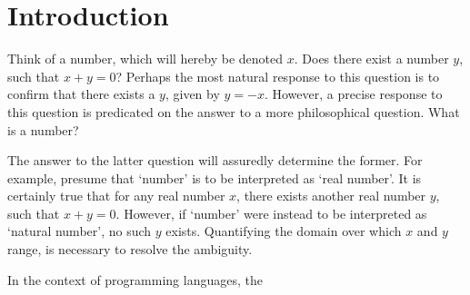 \documentclass[../Dissertation.tex]{subfiles}
\begin{document}
\section{Introduction}
Think of a number, which will hereby be denoted $x$. Does there exist a number $y$, such that $x + y = 0$? Perhaps the most natural response to this question is to confirm that there exists a $y$, given by $y = -x$. However, a precise response to this question is predicated on the answer to a more philosophical question. What is a number?
\par
The answer to the latter question will assuredly determine the former. For example, presume that `number' is to be interpreted as `real number'. It is certainly true that for any real number $x$, there exists another real number $y$, such that $x + y = 0$. However, if `number' were instead to be interpreted as `natural number', no such $y$ exists. Quantifying the domain over which $x$ and $y$ range, is necessary to resolve the ambiguity. 
\par
In the context of programming languages, the
\end{document}

